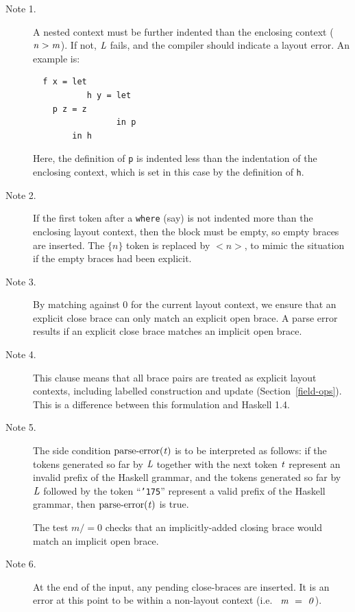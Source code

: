 \begin{description}
\item[Note 1.] A nested context must be further indented 
than the enclosing context (\mbox{$\it n>m$}). If not, \mbox{$\it L$} fails, and the compiler should indicate a
layout error.  An example is:
\bprog
{\small\begin{verbatim}
  f x = let
           h y = let
    p z = z
                 in p
        in h
\end{verbatim}}
\eprog
Here, the definition of \mbox{\tt p} is indented less than the indentation of
the enclosing context, which is set in this case by the definition of \mbox{\tt h}.

\item[Note 2.] If the first token after a \mbox{\tt where} (say) is not indented more
than the enclosing layout context, then the block must be empty, so empty
braces are inserted.  The $\{n\}$ token is replaced by $<n>$, to mimic the
situation if the empty braces had been explicit.

\item[Note 3.] By matching against 0 for the current layout context, 
we ensure that an explicit close brace can only match an explicit open brace. 
A parse error results if an explicit close brace matches an implicit open brace.

\item[Note 4.] This clause means that all brace pairs are treated as explicit layout 
contexts, including labelled construction and update (Section~\ref{field-ops}). 
This is a difference between this formulation and Haskell 1.4.

\item[Note 5.] The side condition \mbox{$\it \mbox{parse-error}(t)$} is to be interpreted as follows: 
if the tokens generated so far by \mbox{$\it L$} together with the next token \mbox{$\it t$} 
represent an invalid prefix of the Haskell grammar, and the 
tokens generated so far by \mbox{$\it L$} followed by the token ``\mbox{\tt {\char'175}}''
represent a valid prefix of the Haskell grammar, then \mbox{$\it \mbox{parse-error}(t)$} is true. 

The test $m /= 0$ checks that an implicitly-added closing brace would match
an implicit open brace.

\item[Note 6.] At the end of the input, any pending close-braces are inserted. 
It is an error at this point to be within a non-layout context (i.e.~ \mbox{$\it m\ =\ 0$}). 
\end{description}

